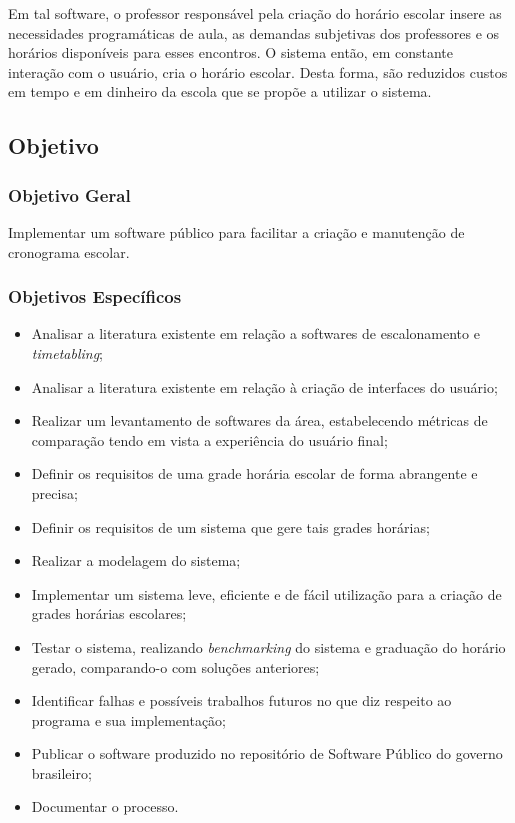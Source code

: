 \documentclass[12pt,a4paper]{article}
\begin{document}
			 \par Em tal software, o professor responsável pela criação do horário escolar insere as necessidades programáticas de aula, as demandas subjetivas dos professores e os horários disponíveis para esses encontros. O sistema então, em constante interação com o usuário, cria o horário escolar.  Desta forma, são reduzidos custos em tempo e em dinheiro da escola que se propõe a utilizar o sistema.

		\subsection{Objetivo}

			\subsubsection{Objetivo Geral}

				\par Implementar um software público para facilitar a criação e manutenção de cronograma escolar.

			\subsubsection{Objetivos Específicos}

				\begin{itemize}
					\item Analisar a literatura existente em relação a softwares de escalonamento e \textit{timetabling};
					\item Analisar a literatura existente em relação à criação de interfaces do usuário;
					\item Realizar um levantamento de softwares da área, estabelecendo métricas de comparação tendo em vista a experiência do usuário final;
					\item Definir os requisitos de uma grade horária escolar de forma abrangente e precisa;
					\item Definir os requisitos de um sistema que gere tais grades horárias;
					\item Realizar a modelagem do sistema;
					\item Implementar um sistema leve, eficiente e de fácil utilização para a criação de grades horárias escolares;
					\item Testar o sistema, realizando \textit{benchmarking} do sistema e graduação do horário gerado, comparando-o com soluções anteriores;
					\item Identificar falhas e possíveis trabalhos futuros no que diz respeito ao programa e sua implementação;
					\item Publicar o software produzido no repositório de Software Público do governo brasileiro;
					\item Documentar o processo.
				\end{itemize}
\end{document}
